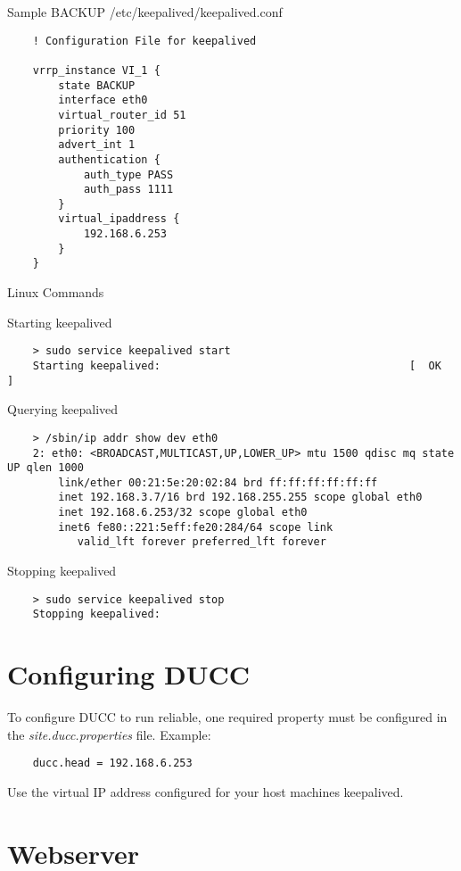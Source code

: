 	Sample BACKUP /etc/keepalived/keepalived.conf
	
	\begin{verbatim}
    ! Configuration File for keepalived

	vrrp_instance VI_1 {
	    state BACKUP
	    interface eth0
	    virtual_router_id 51
	    priority 100
	    advert_int 1
	    authentication {
	        auth_type PASS
	        auth_pass 1111
	    }
	    virtual_ipaddress {
	        192.168.6.253
	    }
	}
   	\end{verbatim}
   	
	Linux Commands
	
	Starting keepalived
	
    \begin{verbatim}
    > sudo service keepalived start
    Starting keepalived:                                       [  OK  ]
   	\end{verbatim}
   	
   	Querying keepalived
	
    \begin{verbatim}
    > /sbin/ip addr show dev eth0
	2: eth0: <BROADCAST,MULTICAST,UP,LOWER_UP> mtu 1500 qdisc mq state UP qlen 1000
	    link/ether 00:21:5e:20:02:84 brd ff:ff:ff:ff:ff:ff
	    inet 192.168.3.7/16 brd 192.168.255.255 scope global eth0
	    inet 192.168.6.253/32 scope global eth0
	    inet6 fe80::221:5eff:fe20:284/64 scope link 
	       valid_lft forever preferred_lft forever
   	\end{verbatim}

	Stopping keepalived
	
    \begin{verbatim}
    > sudo service keepalived stop
    Stopping keepalived: 
   	\end{verbatim}

\section{Configuring DUCC}  
    To configure DUCC to run reliable, one required property must
    be configured in the {\em site.ducc.properties} file.  Example:
    
    \begin{verbatim}
	ducc.head = 192.168.6.253
   	\end{verbatim}
    
    Use the virtual IP address configured for your host machines keepalived. 
    
\section{Webserver}

